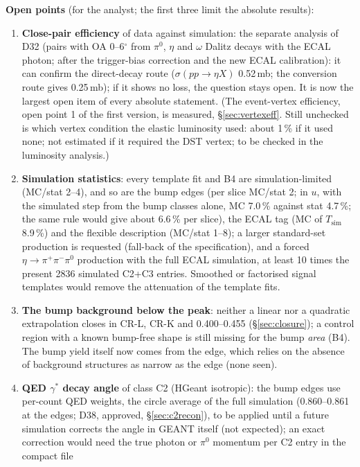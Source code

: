 \documentclass[11pt,a4paper]{article}
\newcommand{\piz}{\ensuremath{\pi^{0}}\xspace}
\newcommand{\pipi}{\ensuremath{\pi^{+}\pi^{-}}\xspace}
\newcommand{\sigeta}{\ensuremath{\sigma(pp\to\eta X)}\xspace}
\begin{document}
\textbf{Open points} (for the analyst; the first three limit the absolute results):
\begin{enumerate}\setlength{\itemsep}{0pt}
\item \textbf{Close-pair efficiency} of data against simulation: the separate analysis of D32 (pairs with OA 0--6$^\circ$ from \piz, $\eta$
      and $\omega$ Dalitz decays with the ECAL photon; after the trigger-bias correction and the new ECAL calibration): it can confirm the
      direct-decay route (\sigeta 0.52\,mb; the conversion route gives 0.25\,mb); if it shows no loss, the question stays open. It is now the largest open item of every absolute statement.
      (The event-vertex efficiency, open point 1 of the first version, is measured, \S\ref{sec:vertexeff}. Still unchecked is which vertex
      condition the elastic luminosity used: about 1\,\% if it used none; not estimated if it required the DST vertex; to be checked in the
      luminosity analysis.)
\item \textbf{Simulation statistics}: every template fit and B4 are simulation-limited (MC/stat 2--4), and so are the bump edges (per slice
      MC/stat 2; in $u$, with the simulated step from the bump classes alone, MC 7.0\,\% against stat 4.7\,\%; the same rule would give about
      6.6\,\% per slice), the ECAL tag (MC of $T_{\mathrm{sim}}$ 8.9\,\%) and the flexible description (MC/stat 1--8); a larger standard-set
      production is requested (fall-back of the specification), and a forced $\eta\to\pipi\piz$ production with the full ECAL simulation, at
      least 10 times the present 2836 simulated C2+C3 entries. Smoothed or factorised signal templates would remove
      the attenuation of the template fits.
\item \textbf{The bump background below the peak}: neither a linear nor a quadratic extrapolation closes in CR-L, CR-K and 0.400--0.455
      (\S\ref{sec:closure}); a control region with a known bump-free shape is still missing for the bump \emph{area} (B4). The bump yield itself
      now comes from the edge, which relies on the absence of background structures as narrow as the edge (none seen).
\item \textbf{QED $\gamma^*$ decay angle} of class C2 (HGeant isotropic): the bump edges use per-count QED weights, the circle average of the
      full simulation (0.860--0.861 at the edges; D38, approved, \S\ref{sec:c2recon}), to be applied until a future simulation corrects the angle
      in GEANT itself (not expected); an exact correction would need the true photon or \piz momentum per C2 entry in the compact file

\end{enumerate}
\end{document}
